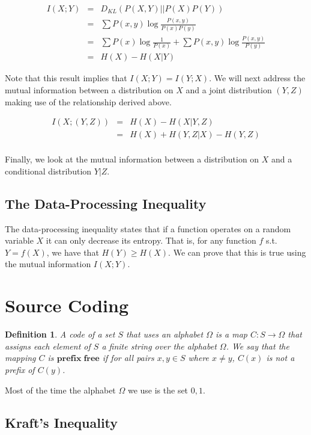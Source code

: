 \documentclass[a4paper,11pt]{book}
\newtheorem{definition}{Definition}
\begin{document}
\begin{eqnarray*}
I(X;Y) &=& D_{KL}(P(X,Y)||P(X)P(Y)) \\
&=& \sum P(x,y) \log \frac{P(x,y)}{P(x)P(y)}\\
&=& \sum P(x)\log \frac{1}{P(x)} + \sum P(x,y)\log \frac{P(x,y)}{P(y)} \\
 &=& H(X) - H(X|Y)
\end{eqnarray*}

Note that this result implies that $I(X;Y) = I(Y;X)$. We will next address the mutual information between a distribution on $X$ and a joint distribution $(Y,Z)$ making use of the relationship derived above. 

\begin{eqnarray*}
I(X;(Y,Z)) &=& H(X) - H(X|Y,Z)\\
&=& H(X) + H(Y,Z|X) - H(Y,Z)\\
\end{eqnarray*}

Finally, we look at the mutual information between a distribution on $X$ and a conditional distribution $Y|Z$.

\subsection{The Data-Processing Inequality}

The data-processing inequality states that if a function operates on a random variable $X$ it can only decrease its entropy. That is, for any function $f$ s.t. $Y= f(X)$, we have that $H(Y) \geq H(X)$. We can prove that this is true using the mutual information $I(X;Y)$.

\section{Source Coding}

\begin{definition}
A code of a set $S$ that uses an alphabet $\Omega$ is a map $C: S\rightarrow \Omega$ that assigns each element of $S$ a finite string over the alphabet $\Omega$. We say that the mapping $C$ is $\mathbf{prefix \; free}$ if for all pairs $x,y \in S$ where $x \neq y$, $C(x)$ is not a prefix of $C(y)$.
\end{definition}

Most of the time the alphabet $\Omega$ we use is the set $0,1$.

\subsection{Kraft's Inequality}
\end{document}
